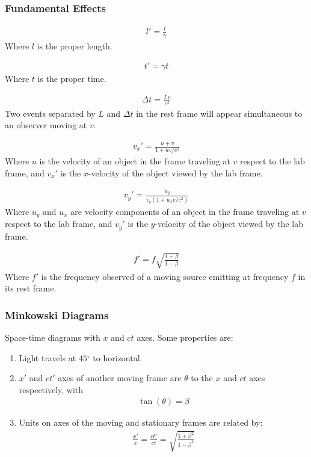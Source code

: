\documentclass[11pt]{article}
\newcommand{\degree}{\ensuremath{^\circ}}
\begin{document}
\begin{multicols*}{3}
\subsubsection*{Fundamental Effects}
\begin{description}
\setlength{\itemsep}{2.5mm}
\item[Length contraction]
	\begin{align*}
	l'=\frac{l}{\gamma}
	\end{align*}
Where $l$ is the proper length.
\item[Time dilation]
	\begin{align*}
	t'=\gamma t
	\end{align*}
Where $t$ is the proper time.
\item [Loss of simultaneity]
	\begin{align*}
	\Delta t = \frac{Lv}{c^2}
	\end{align*}
Two events separated by $L$ and $\Delta t$ in the rest frame will appear simultaneous to an observer moving at $v$.
\item[Longitudinal velocity addition]
	\begin{align*}
	v_x'=\frac{u+v}{1+uv/c^2}
	\end{align*}
Where $u$ is the velocity of an object in the frame traveling at $v$ respect to the lab frame, and $v_x'$ is the $x$-velocity of the object viewed by the lab frame.
\item[Transverse velocity addition]
	\begin{align*}
	v_y'=\frac{u_y}{\gamma_v ( 1+ u_xv/c^2)}
	\end{align*}
Where $u_y$ and $u_x$ are velocity components of an object in the frame traveling at $v$ respect to the lab frame, and $v_y'$ is the $y$-velocity of the object viewed by the lab frame.
\item[Longitudinal Doppler effect]
	\begin{align*}
	f'=f\sqrt{\frac{1+\beta}{1-\beta}}
	\end{align*}
Where $f'$ is the frequency observed of a moving source emitting at frequency $f$ in its rest frame.
\end{description}
\subsubsection*{Minkowski Diagrams}
Space-time diagrams with $x$ and $ct$ axes. Some properties are:
\begin{enumerate}
\item Light travels at $45\degree$ to horizontal.
\item $x'$ and $ct'$ axes of another moving frame are $\theta$ to the $x$ and $ct$ axes respectively, with
	\begin{align*}
	\tan(\theta)=\beta
	\end{align*}
\item Units on axes of the moving and stationary frames are related by:
	\begin{align*}
	\frac{x'}{x}=\frac{ct'}{ct}=\sqrt{\frac{1+\beta^2}{1-\beta^2}}
	\end{align*}
\end{enumerate}

\end{multicols*}
\end{document}
